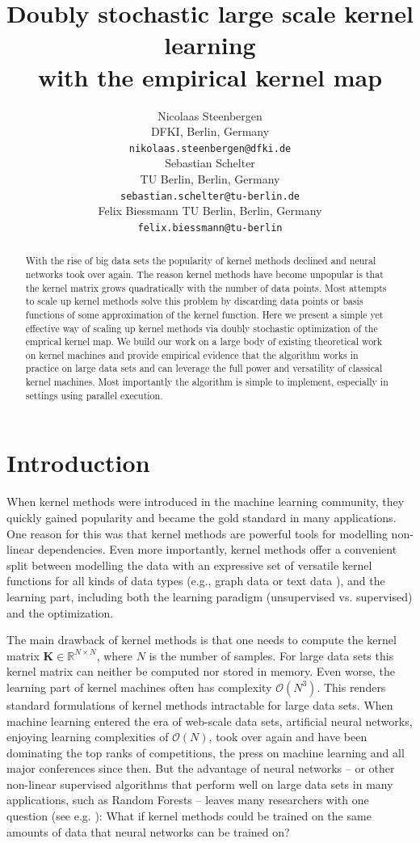 \documentclass{article} %
\title{Doubly stochastic large scale kernel learning \\ with the empirical kernel map}
\author{
Nicolaas Steenbergen\\
DFKI, Berlin, Germany\\
\texttt{nikolaas.steenbergen@dfki.de}\\
\And
Sebastian Schelter\\
TU Berlin, Berlin, Germany\\
\texttt{sebastian.schelter@tu-berlin.de}\\
\And
Felix Biessmann
TU Berlin, Berlin, Germany\\
\texttt{felix.biessmann@tu-berlin}\\
}
\newcommand{\R}{\ensuremath{\mathds{R}}}
\renewcommand{\vec}[1]{\mathbf{#1}}
\begin{document}
\maketitle

\begin{abstract} 
With the rise of big data sets the popularity of kernel methods declined and neural networks took over again. The reason kernel methods have become unpopular is that the kernel matrix grows quadratically with the number of data points. Most attempts to scale up kernel methods  solve this problem by discarding data points or basis functions of some approximation of the kernel function. Here we present a simple yet effective way of scaling up kernel methods via doubly stochastic optimization of the emprical kernel map. We build our work on a large body of existing theoretical work on kernel machines and provide empirical evidence that the algorithm works in practice on large data sets and can leverage the full power and versatility of classical kernel machines. Most importantly the algorithm is simple to implement, especially in settings using parallel execution.
\end{abstract} 


\section{Introduction\vspace{-0.1in}}
\indent When kernel methods \cite{Muller:2001p2592,learning_with_kernels,shawe2004kernel} were introduced in the machine learning community, they quickly gained popularity and became the gold standard in many applications. One reason for this was that kernel methods are powerful tools for modelling non-linear dependencies. Even more importantly, kernel methods offer a convenient split between modelling the data with an expressive set of versatile kernel functions for all kinds of data types (e.g., graph data \cite{shawe2004kernel} or text data \cite{John2000}), and the learning part, including both the learning paradigm (unsupervised vs. supervised) and the optimization. 

The main drawback of kernel methods is that one needs to compute the kernel matrix $\vec{K}\in\R^{N\times N}$, where $N$ is the number of samples. For large data sets this kernel matrix can neither be computed nor stored in memory. Even worse, the learning part of kernel machines often has complexity $\mathcal{O}(N^3)$. This renders standard formulations of kernel methods intractable for large data sets. When machine learning entered the era of web-scale data sets, artificial neural networks, enjoying learning complexities of $\mathcal{O}(N)$, took over again and have been dominating the top ranks of competitions, the press on machine learning and all major conferences since then. But the advantage of neural networks -- or other non-linear supervised algorithms that perform well on large data sets in many applications, such as Random Forests \cite{Breiman2001} -- leaves many researchers with one question (see e.g. \cite{Lu2014}): What if kernel methods could be trained on the same amounts of data that neural networks can be trained on? 
\end{document}
